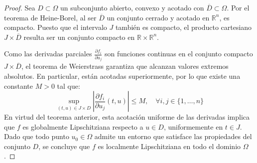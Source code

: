 \begin{proof}
    Sea $D \subset \Omega$ un subconjunto abierto, convexo y acotado con $\overline{D} \subset \Omega$. Por el teorema de Heine-Borel, al ser $\overline{D}$ un conjunto cerrado y acotado en $\mathbb{R}^n$, es compacto. Puesto que el intervalo $J$ también es compacto, el producto cartesiano $J \times \overline{D}$ resulta ser un conjunto compacto en $\mathbb{R} \times \mathbb{R}^n$.
    
    Como las derivadas parciales $\frac{\partial f_i}{\partial u_j}$ son funciones continuas en el conjunto compacto $J \times \overline{D}$, el teorema de Weierstrass garantiza que alcanzan valores extremos absolutos. En particular, están acotadas superiormente, por lo que existe una constante $M > 0$ tal que:
    \[
        \sup_{(t,u) \in J \times D} \left| \frac{\partial f_i}{\partial u_j}(t,u) \right| \leq M, \quad \forall i,j \in \{1, \ldots, n\}
    \]
    En virtud del teorema anterior, esta acotación uniforme de las derivadas implica que $f$ es globalmente Lipschitziana respecto a $u \in D$, uniformemente en $t \in J$. Dado que todo punto $u_0 \in \Omega$ admite un entorno que satisface las propiedades del conjunto $D$, se concluye que $f$ es localmente Lipschitziana en todo el dominio $\Omega$.
\end{proof}

